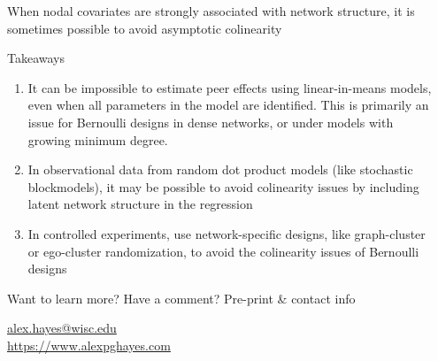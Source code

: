 \documentclass[final]{beamer}
\newlength{\sepwidth}
\newlength{\colwidth}
\newcommand{\separatorcolumn}{\begin{column}{\sepwidth}\end{column}}
\begin{document}
\begin{frame}[t]
\begin{columns}[t]
\begin{column}{\colwidth}
\begin{block}{When nodal covariates are strongly associated with network structure, it is sometimes possible to avoid asymptotic colinearity}
            \end{block}

            \begin{block}{Takeaways}
                \begin{enumerate}
                    \item It can be impossible to estimate peer effects using linear-in-means models, even when all parameters in the model are identified. This is primarily an issue for Bernoulli designs in dense networks, or under models with growing minimum degree.
                    \item In observational data from random dot product models (like stochastic blockmodels), it may be possible to avoid colinearity issues by including latent network structure in the regression
                    \item In controlled experiments, use network-specific designs, like graph-cluster or ego-cluster randomization, to avoid the colinearity issues of Bernoulli designs
                \end{enumerate}
            \end{block}

            \begin{block}{Want to learn more? Have a comment? Pre-print \& contact info}
                \nocite{hayes2024c}
                \printbibliography
                \begin{center}
                    \url{alex.hayes@wisc.edu} \\
                    \url{https://www.alexpghayes.com}
                \end{center}
            \end{block}


        \end{column}

        \separatorcolumn
    \end{columns}
\end{frame}
\end{document}
